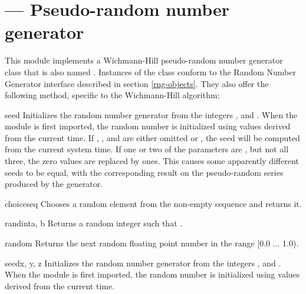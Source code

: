 \section{ ---
         Pseudo-random number generator}



This module implements a Wichmann-Hill pseudo-random number generator
class that is also named .  Instances of the
 class conform to the Random Number Generator
interface described in section \ref{rng-objects}.  They also offer the 
following method, specific to the Wichmann-Hill algorithm:

\begin{methoddesc}[whrandom]{seed}{}
  Initializes the random number generator from the integers ,
   and .  When the module is first imported, the random
  number is initialized using values derived from the current time.
  If , , and  are either omitted or , the 
  seed will be computed from the current system time.  If one or two
  of the parameters are , but not all three, the zero values
  are replaced by ones.  This causes some apparently different seeds
  to be equal, with the corresponding result on the pseudo-random
  series produced by the generator.
\end{methoddesc}

\begin{funcdesc}{choice}{seq}
Chooses a random element from the non-empty sequence  and returns it.
\end{funcdesc}

\begin{funcdesc}{randint}{a, b}
Returns a random integer  such that .
\end{funcdesc}

\begin{funcdesc}{random}{}
Returns the next random floating point number in the range [0.0 ... 1.0).
\end{funcdesc}

\begin{funcdesc}{seed}{x, y, z}
Initializes the random number generator from the integers ,
 and .  When the module is first imported, the random
number is initialized using values derived from the current time.
\end{funcdesc}

